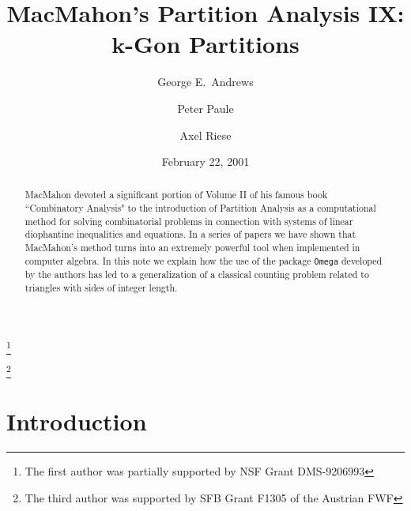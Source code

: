 \documentclass[reqno]{amsart}
\theoremstyle{plain}
\theoremstyle{definition}
\theoremstyle{remark}
\begin{document}
\title[MacMahon's Partition Analysis IX: $k$-Gon Partitions]
      {MacMahon's Partition Analysis IX:\\
       $\boldsymbol{k}$-Gon Partitions}

\author{George E.~Andrews}
\address{Department of Mathematics\\
         The Pennsylvania State University\\
         University Park, PA~16802, USA}
\thanks{The first author was partially supported by NSF Grant DMS-9206993}

\author{Peter Paule}
\address{Research Institute for Symbolic Computation\\
         Johannes Kepler University Linz\\
         A--4040~Linz, Austria}

\author{Axel Riese}
\address{Research Institute for Symbolic Computation\\
         Johannes Kepler University Linz\\
         A--4040~Linz, Austria}
\thanks{The third author was supported by SFB Grant F1305 of the Austrian FWF}

\date{February 22, 2001}

\begin{abstract}
MacMahon devoted a significant portion of Volume II of
his famous book ``Combinatory Analysis" to the introduction
of Partition Analysis as a computational method for solving combinatorial
problems in connection with systems of linear diophantine inequalities
and equations. In a series of papers we have shown that MacMahon's
method turns into an extremely powerful tool when implemented in computer
algebra. In this note we explain how the use of the package \texttt{Omega}
developed by the authors has led to a generalization of a classical
counting problem related to triangles with sides of integer length.
\end{abstract}

\maketitle


\section{Introduction}
\label{sec:intro}
\end{document}
